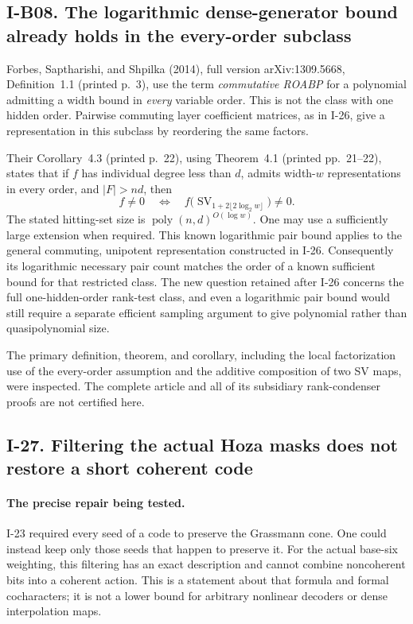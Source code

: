 \documentclass[11pt,a4paper]{article}
\theoremstyle{definition}\newtheorem{definition}{Definition}
\begin{document}
\subsection{I-B08. The logarithmic dense-generator bound already holds in the every-order subclass}
\label{I-B08}

Forbes, Saptharishi, and Shpilka (2014), full version
arXiv:1309.5668, Definition~1.1 (printed p.~3), use the term
\emph{commutative ROABP} for a polynomial admitting a width
bound in \emph{every} variable order.  This is not the class
with one hidden order.  Pairwise commuting layer coefficient
matrices, as in I-26, give a representation in this subclass
by reordering the same factors.

Their Corollary~4.3 (printed p.~22), using Theorem~4.1
(printed pp.~21--22), states that if $f$ has individual degree
less than $d$, admits width-$w$ representations in every order,
and $|F|>nd$, then
\[
 f\ne0\quad\Longleftrightarrow\quad
 f\bigl(\operatorname{SV}_{1+2\lfloor2\log_2w\rfloor}\bigr)
       \ne0.
\]
The stated hitting-set size is
$\operatorname{poly}(n,d)^{O(\log w)}$.
One may use a sufficiently large extension when required.
This known logarithmic pair bound applies to the general
commuting, unipotent representation constructed in I-26.
Consequently its logarithmic necessary pair count matches
the order of a known sufficient bound for that restricted
class.  The new question retained after I-26 concerns the
full one-hidden-order rank-test class, and even a logarithmic
pair bound would still require a separate efficient sampling
argument to give polynomial rather than quasipolynomial size.

The primary definition, theorem, and corollary, including
the local factorization use of the every-order assumption
and the additive composition of two SV maps, were inspected.
The complete article and all of its subsidiary rank-condenser
proofs are not certified here.


\subsection{I-27. Filtering the actual Hoza masks does not restore a short coherent code}
\label{I-27}

\paragraph{The precise repair being tested.}
I-23 required every seed of a code to preserve the Grassmann cone.
One could instead keep only those seeds that happen to preserve it.
For the actual base-six weighting, this filtering has an exact
description and cannot combine noncoherent bits into a coherent
action.  This is a statement about that formula and formal
cocharacters; it is not a lower bound for arbitrary nonlinear
decoders or dense interpolation maps.
\end{document}
